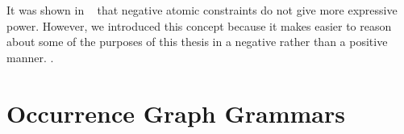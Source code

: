 \begin{remark} It was shown in ~\cite{Ehrig2006} that negative atomic constraints do not give more expressive power. However, we introduced this concept because it makes easier to reason about some of the purposes of this thesis in a negative rather than a positive manner. .
\end{remark}

\begin{definition}


\end{definition}

\begin{definition}
\end{definition}

\begin{definition}
\end{definition}

\begin{definition}
\end{definition}


\section{Occurrence Graph Grammars}

\begin{definition}
\end{definition}

\begin{definition}
\end{definition}

\begin{definition}
\end{definition}

\begin{definition}
\end{definition}
